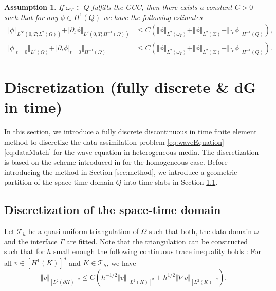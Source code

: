 \documentclass[sn-mathphys-num]{sn-jnl}
\newtheorem{assum}{Assumption}
\numberwithin{equation}{section}
\newcommand{\dt}{\partial_t}
\begin{document}
\begin{assum}\label{assum:LipschitzStability}
    If $\omega_T \subset Q$ fulfills the GCC, then there exists a constant $C > 0$ such that for any $\phi \in H^1(Q)$ we have the following estimates
    \begin{align*}
        \Vert \phi \Vert_{L^\infty(0,T;L^2(\Omega))} + \Vert \dt \phi \Vert_{L^2(0,T;H^{-1}(\Omega))} &\le C \left(  \Vert \phi \Vert_{L^2(\omega_T)} + \Vert \phi \Vert_{L^2(\Sigma)} + \Vert \square_c \phi \Vert_{H^{-1}(Q)} \right), \\
        \Vert \phi \vert_{t = 0} \Vert_{L^2(\Omega)} + \Vert \dt \phi \vert_{t = 0} \Vert_{H^{-1}(\Omega)} &\le C \left(\Vert \phi \Vert_{L^2(\omega_T)} + \Vert \phi \Vert_{L^2(\Sigma)} + \Vert \square_c \phi \Vert_{H^{-1}(Q)} \right). 
    \end{align*}
\end{assum}


\section{Discretization (fully discrete \& dG in time)} 
\noindent In this section, we introduce a fully discrete discontinuous in time finite element method to discretize the data assimilation problem \eqref{eq:waveEquation}-\eqref{eq:dataMatch} for the wave equation in heterogeneous media. The discretization is based on the scheme introduced in \cite{BP24} for the homogeneous case. Before introducing the method in Section \ref{sec:method}, we introduce a geometric partition of the space-time domain $Q$ into time slabs in Section \ref{sec:spaceTimeDiscretization}. 

\subsection{Discretization of the space-time domain}\label{sec:spaceTimeDiscretization}
Let $\mathcal{T}_h$ be a quasi-uniform triangulation of $\Omega$ such that both, the data domain $\omega$ and the interface $\Gamma$ are fitted. 
Note that the triangulation can be constructed such that for $h$ small enough the following continuous trace inequality holds \cite[Sec. 4.2]{BFMO21control}: For all $v \in [H^1(K)]^d$ and $K \in \mathcal{T}_h$, we have
\begin{equation}\label{eq:traceInequality}
    \Vert v \Vert_{[L^2(\partial K)]^d} \le C \left(h^{-1/2} \Vert v \Vert_{[L^2(K)]^d} + h^{1/2} \Vert \nabla v \Vert_{[L^2(K)]^d} \right).  
\end{equation}
\end{document}
